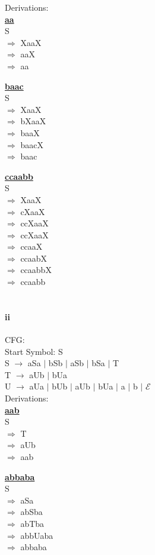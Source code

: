 \documentclass[10pt,letter]{article}
\begin{document}
Derivations: \\
\textbf{\underline{aa}} \\
S\\
$\Rightarrow$ XaaX \\
$\Rightarrow$ aaX \\
$\Rightarrow$ aa

\textbf{\underline{baac}} \\
S\\
$\Rightarrow$ XaaX \\
$\Rightarrow$ bXaaX \\
$\Rightarrow$ baaX \\
$\Rightarrow$ baacX \\
$\Rightarrow$ baac 

\textbf{\underline{ccaabb}} \\ 
S\\
$\Rightarrow$ XaaX \\
$\Rightarrow$ cXaaX \\
$\Rightarrow$ ccXaaX \\
$\Rightarrow$ ccXaaX \\
$\Rightarrow$ ccaaX \\
$\Rightarrow$ ccaabX \\
$\Rightarrow$ ccaabbX \\
$\Rightarrow$ ccaabb \\ \\


\paragraph{ii} CFG: \\
Start Symbol: S\\
S $\rightarrow$ aSa $\mid$ bSb $\mid$ aSb $\mid$ bSa $\mid$ T \\
T $\rightarrow$ aUb $\mid$ bUa \\
U $\rightarrow$ aUa $\mid$ bUb $\mid$ aUb $\mid$ bUa $\mid$ a $\mid$ b $\mid$ $\mathcal{E}$ \\

Derivations: \\
\textbf{\underline{aab}} \\
S\\
$\Rightarrow$ T \\
$\Rightarrow$ aUb \\
$\Rightarrow$ aab 

\textbf{\underline{abbaba}} \\
S\\
$\Rightarrow$ aSa \\
$\Rightarrow$ abSba \\
$\Rightarrow$ abTba \\
$\Rightarrow$ abbUaba \\
$\Rightarrow$ abbaba \\
\end{document}
